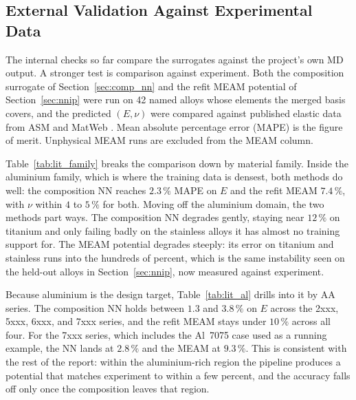 \subsection{External Validation Against Experimental Data}
\label{sec:validation}

The internal checks so far compare the surrogates against the project's own MD
output. A stronger test is comparison against experiment. Both the composition surrogate of
Section~\ref{sec:comp_nn} and the refit MEAM potential of
Section~\ref{sec:nnip} were run on 42 named alloys whose elements the merged
basis covers, and the predicted $(E,\nu)$ were compared against published
elastic data from ASM and MatWeb \citep{asmmatweb}. Mean absolute percentage
error (MAPE) is the figure of merit. Unphysical MEAM runs are excluded from
the MEAM column.

Table~\ref{tab:lit_family} breaks the comparison down by material family.
Inside the aluminium family, which is where the training data is densest, both
methods do well: the composition NN reaches $2.3\,\%$ MAPE on $E$ and the
refit MEAM $7.4\,\%$, with $\nu$ within $4$ to $5\,\%$ for both. Moving off the
aluminium domain, the two methods part ways. The composition NN degrades
gently, staying near $12\,\%$ on titanium and only failing badly on the
stainless alloys it has almost no training support for. The MEAM
potential degrades steeply: its error on titanium and stainless runs into the
hundreds of percent, which is the same instability seen on the held-out alloys
in Section~\ref{sec:nnip}, now measured against experiment.

\begin{table}[htbp]
	\centering
	\caption{Validation against ASM/MatWeb experimental elastic data, by
	material family ($N=42$ alloys). Values are MAPE in percent for the
	composition NN (ML) and the refit MEAM potential. Unphysical MEAM runs are
	excluded.}
	\label{tab:lit_family}
	
\end{table}

Because aluminium is the design target, Table~\ref{tab:lit_al} drills into it
by AA series. The composition NN holds between $1.3$ and $3.8\,\%$ on $E$
across the 2xxx, 5xxx, 6xxx, and 7xxx series, and the refit MEAM stays under
$10\,\%$ across all four. For the 7xxx series, which includes the Al~7075 case
used as a running example, the NN lands at $2.8\,\%$ and the MEAM at $9.3\,\%$.
This is consistent with the rest of the report: within the
aluminium-rich region the pipeline produces a potential that matches
experiment to within a few percent, and the accuracy falls off only once the
composition leaves that region.

